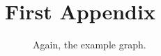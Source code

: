 \chapter{First Appendix}
\vspace*{-0.3in}
\begin{figure}[hb!]
\begin{center}
\end{center}
\caption{Again, the example graph.}
\end{figure}

